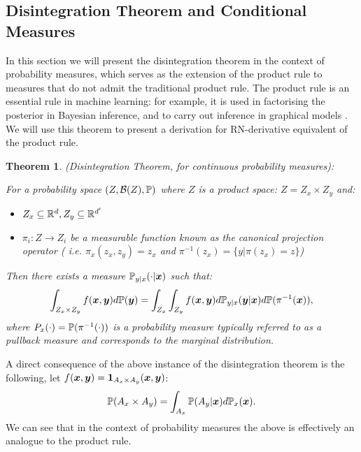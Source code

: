 \documentclass[a4paper,12pt,twoside,openright]{report}
\newtheorem{theorem}{Theorem}
\theoremstyle{definition}
\begin{document}
\subsection{Disintegration Theorem and Conditional Measures}

In this section we will present the disintegration theorem in the context of probability measures, which serves as the extension of the product rule to measures that do not admit the traditional product rule. The product rule is an essential rule in machine learning: for example, it is used in factorising the posterior in Bayesian inference, and to carry out inference in graphical models \citep{koller2009probabilistic}. We will use this theorem to present a derivation for RN-derivative equivalent of the product rule.

\begin{theorem} (Disintegration Theorem, for continuous probability measures): 

For a probability space $(Z, \calB(Z) ,\P)$ where $Z$ is a product space: $Z = Z_x \times Z_y$ and:
\begin{itemize}
    \item  $Z_x \subseteq \R^d, Z_y \subseteq \R^{d'}$
    \item  $\pi_i: Z \rightarrow Z_i$ be a measurable function known as the canonical projection operator ( i.e. $\pi_x(z_x,z_y) = z_x$ and $\pi^{-1}(z_x) = \{y | \pi(z_x) = z\}$)
\end{itemize}
Then there exists a measure $\P_{y|x}(\cdot | \vx)$ such that:
  \begin{align}
      \int_{Z_x \times Z_y} f(\vx, \vy) d\P(\vy) = \int_{Z_x}\int_{Z_y} f(\vx,\vy) d\P_{y|x}(\vy | \vx) d\P(\pi^{-1}(\vx)),
  \end{align}
 where $P_x(\cdot) = \P(\pi^{-1}(\cdot))$  is a probability measure typically referred to as a pullback measure and corresponds to the marginal distribution.
\end{theorem}

A direct consequence of the above instance of the disintegration theorem is the following, let $f(\vx,\vy) = \ind_{A_x \times A_y}(\vx,\vy)$:
\begin{align}
    \P(A_x \times A_y) = \int_{A_x}\P(A_y | \vx) d\P_x(\vx).
\end{align}
 We can see that in the context of probability measures the above is effectively an analogue to the product rule.
\end{document}
